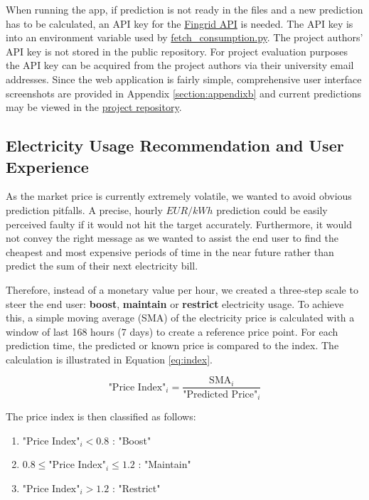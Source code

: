 \documentclass{article}
\begin{document}
When running the app, if prediction is not ready in the files and a new prediction has to be calculated, an API key for the \href{https://data.fingrid.fi/open-data-forms/registration/}{Fingrid API} is needed. The API key is into an environment variable used by \href{https://github.com/IDS-mini/electricity/blob/main/src/app/utils/fetch_consumption.py}{fetch\_consumption.py}. The project authors' API key is not stored in the public repository. For project evaluation purposes the API key can be acquired from the project authors via their university email addresses. Since the web application is fairly simple, comprehensive user interface screenshots are provided in Appendix \ref{section:appendixb} and current predictions may be viewed in the \href{https://github.com/IDS-mini/electricity/blob/main/forecast_data/forecasts.csv}{project repository}.

\subsection{Electricity Usage Recommendation and User Experience}
\label{subsection:ux}

As the market price is currently extremely volatile, we wanted to avoid obvious prediction pitfalls. A precise, hourly $EUR/kWh$ prediction could be easily perceived faulty if it would not hit the target accurately. Furthermore, it would not convey the right message as we wanted to assist the end user to find the cheapest and most expensive periods of time in the near future rather than predict the sum of their next electricity bill.

Therefore, instead of a monetary value per hour, we created a three-step scale to steer the end user: \textbf{boost}, \textbf{maintain} or \textbf{restrict} electricity usage. To achieve this, a simple moving average (SMA) of the electricity price is calculated with a window of last 168 hours (7 days) to create a reference price point. For each prediction time, the predicted or known price is compared to the index. The calculation is illustrated in Equation \ref{eq:index}.


\begin{equation} \label{eq:index}
\text{"Price Index"}_i = \frac{\text{SMA}_i}{\text{"Predicted Price"}_i}
\end{equation}

The price index is then classified as follows:

\begin{enumerate}
    \item $\text{"Price Index"}_i < 0.8$ : "Boost"
    \item $0.8 \leq \text{"Price Index"}_i \leq 1.2$ : "Maintain"
    \item $\text{"Price Index"}_i > 1.2$ : "Restrict"
\end{enumerate}
\end{document}
